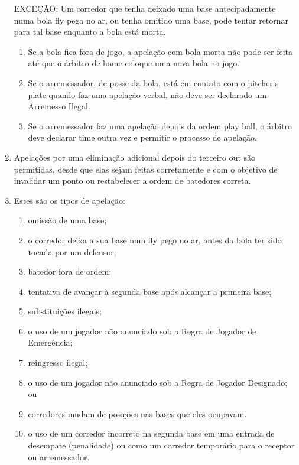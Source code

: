 \begin{enumerate}[label=(\alph*)]
	\vspace{3mm}
	 EXCEÇÃO: Um corredor que tenha deixado uma base antecipadamente numa  bola \gls{fly} pega no ar, ou tenha omitido uma base, pode tentar retornar para tal  base enquanto a bola está morta.

	 \begin{enumerate}[label=\roman*.]
		\item Se a bola fica fora de jogo, a apelação com bola morta não pode ser feita até que o árbitro de \gls{home} coloque uma nova bola no jogo.
		\item  Se o arremessador, de posse da bola, está em contato com o \gls{pitcher's plate} quando faz uma apelação verbal, não deve ser declarado um Arremesso Ilegal.
		\item  Se o arremessador faz uma apelação depois da ordem \gls{play ball}, o árbitro deve declarar \gls{time} outra vez e permitir o processo de apelação.
	 \end{enumerate}
	\item Apelações por uma eliminação adicional depois do terceiro \gls{out} são permitidas, desde que elas sejam feitas corretamente e com o objetivo de invalidar um ponto ou restabelecer a ordem de batedores correta.

	\item  Estes são os tipos de apelação:
	 \begin{enumerate}[label=\roman*.]
		\item omissão de uma base;
		\item  o corredor deixa a sua base num \gls{fly} pego no ar, antes da bola ter sido tocada por um defensor;
		\item  batedor fora de ordem;
		\item  tentativa de avançar à segunda base após alcançar a primeira base;
		\item  substituições ilegais;
		\item  o uso de um jogador não anunciado sob a Regra de Jogador de Emergência;
		\item  reingresso ilegal;
		\item  o uso de um jogador não anunciado sob a Regra de Jogador Designado; ou
		\item  corredores mudam de posições nas bases que eles ocupavam.
		\item  o uso de um corredor incorreto na segunda base em uma entrada de desempate (penalidade) ou como um corredor temporário para o receptor ou arremessador.
	\end{enumerate}
	\end{enumerate}

